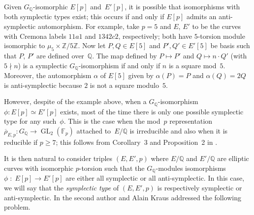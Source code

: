 \documentclass[12pt]{amsart}
\newcommand{\F}{\mathbb{F}}
\newcommand{\Q}{\mathbb{Q}}
\newcommand{\Z}{\mathbb{Z}}
\newcommand{\rhobar}{{\overline{\rho}}}
\newcommand{\GL}{\operatorname{GL}}
\numberwithin{equation}{section}
\theoremstyle{definition}
\theoremstyle{remark}
\begin{document}

Given $G_\Q$-isomorphic $E[p]$ and~$E'[p]$,
it is possible that isomorphisms with both symplectic types exist; this occurs if and only if $E[p]$ admits 
an anti-symplectic automorphism. 
For example, take $p=5$ and $E$, $E'$ to be the curves 
with Cremona labels $11a1$ and $1342c2$, respectively; 
both have $5$-torsion module isomorphic to $\mu_5 \times \Z/5\Z$.
Now let $P,Q \in E[5]$ and $P',Q' \in E'[5]$ be basis such that $P$, $P'$ are defined over~$\Q$.
The map defined by $P \mapsto P'$ and $Q \mapsto n\cdot Q'$ (with $5 \nmid n$)
is a symplectic $G_\Q$-isomorphism if and only if $n$ is a square mod~$5$.  
Moreover, the automorphism $\alpha$ of $E[5]$ given by $\alpha(P) = P$ and $\alpha(Q) = 2Q$ 
is anti-symplectic because $2$ is not a square modulo~$5$.

However, despite of the example above, when a $G_\Q$-isomorphism $\phi : E[p] \simeq E'[p]$
exists, most of the time there is only one possible symplectic 
type for any such~$\phi$.
This is the case when the mod~$p$ representation 
$\rhobar_{E,p} : G_\Q \to \GL_2(\F_p)$ attached to~$E/\Q$ 
is irreducible and
also when it is reducible if $p \geq 7$; 
this follows from Corollary~3 and Proposition~2 in \cite{FKSym}.

It is then natural to consider triples $(E,E',p)$ where $E/\Q$ and $E'/\Q$ are elliptic curves with 
isomorphic $p$-torsion such that the $G_\Q$-modules 
isomorphisms $\phi \; : \; E[p] \rightarrow E'[p]$ are either all symplectic or all anti-symplectic. 
In this case, we will say that the {\it symplectic type} of $(E,E',p)$
is respectively symplectic or anti-symplectic.
In \cite{FKSym} the second author and Alain Kraus 
addressed the following problem.
\end{document}
